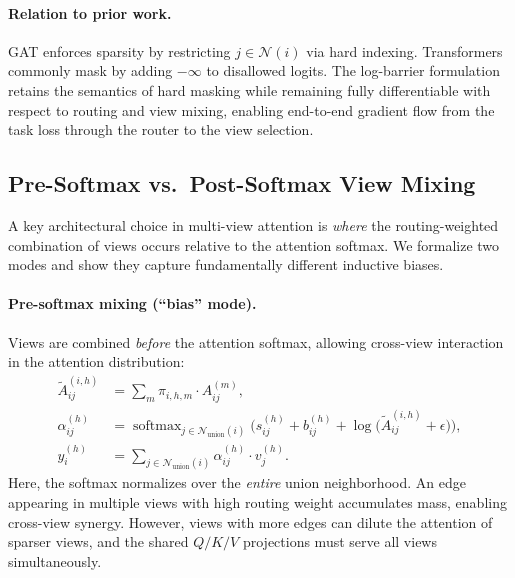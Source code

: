 \documentclass[11pt,a4paper]{article}
\newcommand{\calN}{\mathcal{N}}
\DeclareMathOperator{\softmax}{softmax}
\begin{document}
\paragraph{Relation to prior work.}
GAT \citep{velickovic2018graph} enforces sparsity by restricting
$j \in \calN(i)$ via hard indexing.
Transformers commonly mask by adding $-\infty$ to disallowed logits.
The log-barrier formulation retains the semantics of hard masking while
remaining fully differentiable with respect to routing and view mixing,
enabling end-to-end gradient flow from the task loss through the router
to the view selection.

\subsection{Pre-Softmax vs.\ Post-Softmax View Mixing}
\label{sec:pre_vs_post}

A key architectural choice in multi-view attention is \emph{where} the
routing-weighted combination of views occurs relative to the attention
softmax.
We formalize two modes and show they capture fundamentally different
inductive biases.

\paragraph{Pre-softmax mixing (``bias'' mode).}
Views are combined \emph{before} the attention softmax, allowing
cross-view interaction in the attention distribution:
\begin{align}
  \tilde{A}_{ij}^{(i,h)} &= \sum_{m} \pi_{i,h,m} \cdot A_{ij}^{(m)},
  \label{eq:presoftmax_A} \\
  \alpha_{ij}^{(h)} &= \softmax_{j \in \calN_{\mathrm{union}}(i)}\!\Big(
    s_{ij}^{(h)} + b_{ij}^{(h)} +
    \log\big(\tilde{A}_{ij}^{(i,h)} + \epsilon\big)\Big),
  \label{eq:presoftmax_attn} \\
  y_i^{(h)} &= \sum_{j \in \calN_{\mathrm{union}}(i)}
    \alpha_{ij}^{(h)} \cdot v_j^{(h)}.
  \label{eq:presoftmax_agg}
\end{align}
Here, the softmax normalizes over the \emph{entire} union neighborhood.
An edge appearing in multiple views with high routing weight accumulates
mass, enabling cross-view synergy.
However, views with more edges can dilute the attention of sparser views,
and the shared $Q/K/V$ projections must serve all views simultaneously.
\end{document}

